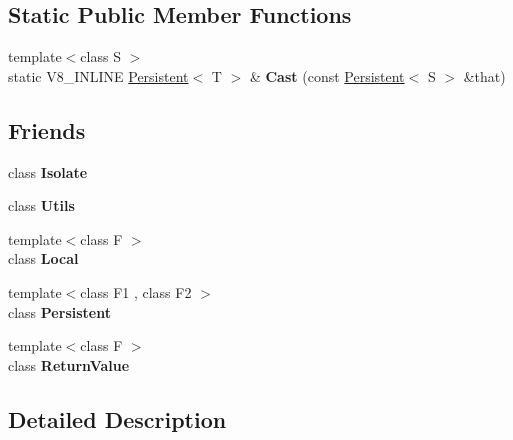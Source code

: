 \subsection*{Static Public Member Functions}
\begin{DoxyCompactItemize}
\item 
\mbox{\label{classv8_1_1Persistent_aefcf5962630a14c198f466f64a685946}} 
{\footnotesize template$<$class S $>$ }\\static V8\+\_\+\+I\+N\+L\+I\+NE \mbox{\hyperlink{classv8_1_1Persistent}{Persistent}}$<$ T $>$ \& {\bfseries Cast} (const \mbox{\hyperlink{classv8_1_1Persistent}{Persistent}}$<$ S $>$ \&that)
\end{DoxyCompactItemize}
\subsection*{Friends}
\begin{DoxyCompactItemize}
\item 
\mbox{\label{classv8_1_1Persistent_aba4f0964bdacf2bbf62cf876e5d28d0a}} 
class {\bfseries Isolate}
\item 
\mbox{\label{classv8_1_1Persistent_abc0f7da619e9e72510dc07ed7b5ff6d8}} 
class {\bfseries Utils}
\item 
\mbox{\label{classv8_1_1Persistent_afb872edb4aac7ba55f0da004113aa2b0}} 
{\footnotesize template$<$class F $>$ }\\class {\bfseries Local}
\item 
\mbox{\label{classv8_1_1Persistent_ad845ec8872174be0a9ca9a3dd1898d30}} 
{\footnotesize template$<$class F1 , class F2 $>$ }\\class {\bfseries Persistent}
\item 
\mbox{\label{classv8_1_1Persistent_a53f604d3d6f2dc0647df33c9979f116a}} 
{\footnotesize template$<$class F $>$ }\\class {\bfseries Return\+Value}
\end{DoxyCompactItemize}


\subsection{Detailed Description}
